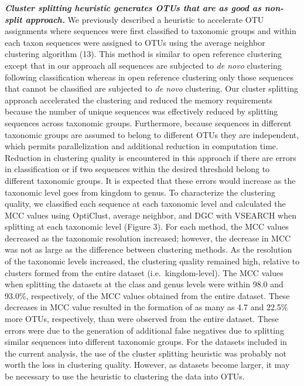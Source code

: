 \documentclass[11pt,]{article}
\begin{document}
\textbf{\emph{Cluster splitting heuristic generates OTUs that are as
good as non-split approach.}} We previously described a heuristic to
accelerate OTU assignments where sequences were first classified to
taxonomic groups and within each taxon sequences were assigned to OTUs
using the average neighbor clustering algorithm (13). This method is
similar to open reference clustering except that in our approach all
sequences are subjected to \emph{de novo} clustering following
classification whereas in open reference clustering only those sequences
that cannot be classified are subjected to \emph{de novo} clustering.
Our cluster splitting approach accelerated the clustering and reduced
the memory requirements because the number of unique sequences was
effectively reduced by splitting sequences across taxonomic groups.
Furthermore, because sequences in different taxonomic groups are assumed
to belong to different OTUs they are independent, which permits
parallelization and additional reduction in computation time. Reduction
in clustering quality is encountered in this approach if there are
errors in classification or if two sequences within the desired
threshold belong to different taxonomic groups. It is expected that
these errors would increase as the taxonomic level goes from kingdom to
genus. To characterize the clustering quality, we classified each
sequence at each taxonomic level and calculated the MCC values using
OptiClust, average neighbor, and DGC with VSEARCH when splitting at each
taxonomic level (Figure 3). For each method, the MCC values decreased as
the taxonomic resolution increased; however, the decrease in MCC was not
as large as the difference between clustering methods. As the resolution
of the taxonomic levels increased, the clustering quality remained high,
relative to clusters formed from the entire dataset
(i.e.~kingdom-level). The MCC values when splitting the datasets at the
class and genus levels were within 98.0 and 93.0\%, respectively, of the
MCC values obtained from the entire dataset. These decreases in MCC
value resulted in the formation of as many as 4.7 and 22.5\% more OTUs,
respectively, than were observed from the entire dataset. These errors
were due to the generation of additional false negatives due to
splitting similar sequences into different taxonomic groups. For the
datasets included in the current analysis, the use of the cluster
splitting heuristic was probably not worth the loss in clustering
quality. However, as datasets become larger, it may be necessary to use
the heuristic to clustering the data into OTUs.
\end{document}
